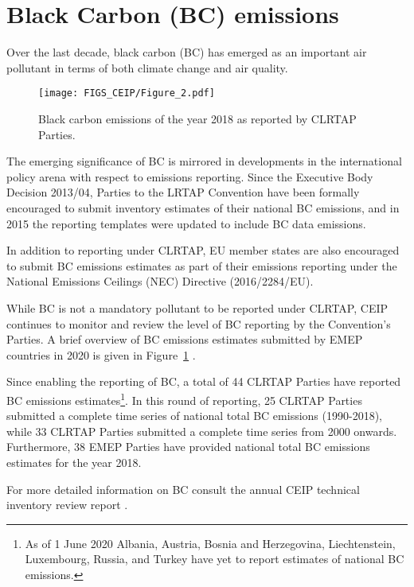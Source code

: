 \section{Black Carbon (BC) emissions}  
\label{sec:bc}

Over the last decade, black carbon (BC) has emerged as an important air pollutant in terms of both climate change and air quality.  

\begin{figure}[h]
\centering
{\texttt{[image: FIGS\_CEIP/Figure\_2.pdf]}}
\caption{Black carbon emissions of the year 2018 as reported by CLRTAP Parties.}
\label{fig:CEIP2}
\end{figure}


The emerging significance of BC is mirrored in developments in the international policy arena with respect to emissions reporting.
Since the Executive Body Decision 2013/04, Parties to the LRTAP Convention have been formally encouraged to
submit inventory estimates of their national BC emissions, and in 2015 the reporting templates were updated to include
BC data emissions.

In addition to reporting under CLRTAP, EU member states are also encouraged to submit BC emissions
estimates as part of their emissions reporting under the National Emissions Ceilings (NEC) Directive (2016/2284/EU).


While BC is not a mandatory pollutant to be reported under CLRTAP, CEIP continues to monitor and review the level of BC reporting by the Convention's Parties. A brief overview of BC emissions estimates submitted by EMEP countries in 2020 is given in Figure~\ref{fig:CEIP2} .

Since enabling the reporting of BC, a total of 44 CLRTAP Parties have reported BC emissions estimates\footnote{ As of 1 June 2020 Albania, Austria, Bosnia and Herzegovina, Liechtenstein, Luxembourg, Russia, and Turkey have yet to report estimates of national BC emissions.}. In this round of reporting, 25 CLRTAP Parties submitted a complete time series of national total BC emissions (1990-2018), while 33 CLRTAP Parties submitted a complete time series from 2000 onwards. Furthermore, 38 EMEP Parties have provided national total BC emissions estimates for the year 2018.

For more detailed information on BC consult the annual CEIP technical inventory review report \citep{CEIP2020}.

